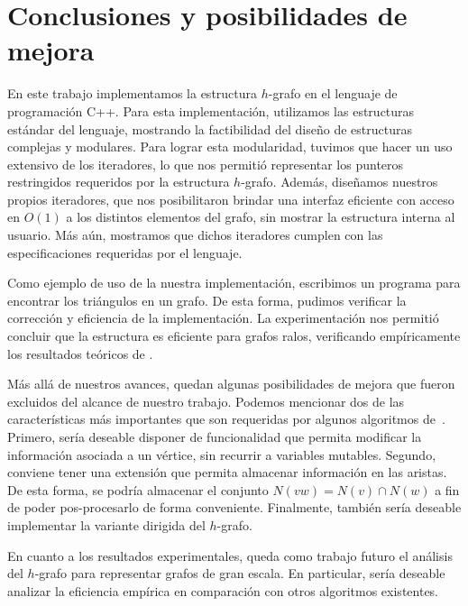 \documentclass[%
    a4paper,%
    fontsize=12pt,%
    DIV=12,
    twoside,%
    openright,%
    titlepage=true,%
    headsepline,%
    toc=bibliography,%
    parskip=half,%
    cleardoublepage=empty,%
    headings=big,%
]{scrbook}
\DeclareRobustCommand{\CPP}{C\nolinebreak[4]\hspace{-.05em}\raisebox{.4ex}{\relsize{-3}\textbf{++}}\xspace}
\def\CPP{C++}%
\begin{document}
\chapter{Conclusiones y posibilidades de mejora}
\label{sec:final}

En este trabajo implementamos la estructura $h$-grafo en el lenguaje de programación \CPP.  Para esta implementación, utilizamos las estructuras estándar del lenguaje, mostrando la factibilidad del diseño de estructuras complejas y modulares.  Para lograr esta modularidad, tuvimos que hacer un uso extensivo de los iteradores, lo que nos permitió representar los punteros restringidos requeridos por la estructura $h$-grafo. Además, diseñamos nuestros propios iteradores, que nos posibilitaron brindar una interfaz eficiente con acceso en $O(1)$ a los distintos elementos del grafo, sin mostrar la estructura interna al usuario.  Más aún, mostramos que dichos iteradores cumplen con las especificaciones requeridas por el lenguaje.

Como ejemplo de uso de la nuestra implementación, escribimos un programa para encontrar los triángulos en un grafo.  De esta forma, pudimos verificar la corrección y eficiencia de la implementación.  La experimentación nos permitió concluir que la estructura es eficiente para grafos ralos, verificando empíricamente los resultados teóricos de \cite{LinSoulignacSzwarcfiterTCS2012}.

Más allá de nuestros avances, quedan algunas posibilidades de mejora que fueron excluidos del alcance de nuestro trabajo.  Podemos mencionar dos de las características más importantes que son requeridas por algunos algoritmos de~\cite{LinSoulignacSzwarcfiterTCS2012}.  Primero, sería deseable disponer de funcionalidad que permita modificar la información asociada a un vértice, sin recurrir a variables mutables.  Segundo, conviene tener una extensión que permita almacenar información en las aristas.  De esta forma, se podría almacenar el conjunto $N(vw) = N(v) \cap N(w)$ a fin de poder pos-procesarlo de forma conveniente.  Finalmente, también sería deseable implementar la variante dirigida del $h$-grafo.

En cuanto a los resultados experimentales, queda como trabajo futuro el análisis del $h$-grafo para representar grafos de gran escala.  En particular, sería deseable analizar la eficiencia empírica en comparación con otros algoritmos existentes.

\backmatter




\todos
\end{document}
